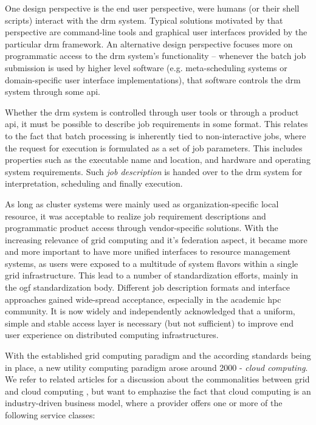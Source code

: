 \documentclass[twocolumn]{svjour3}       %
\begin{document}
One design perspective is the end user perspective, were humans (or their shell scripts) interact with the \gls{drm} system. Typical solutions motivated by that perspective are command-line tools and graphical user interfaces provided by the particular \gls{drm} framework. An alternative design perspective focuses more on programmatic access to the \gls{drm} system's functionality -- whenever the batch job submission is used by higher level software (e.g. meta-scheduling systems or domain-specific user interface implementations), that software controls the \gls{drm} system through some \gls{api}.

Whether the \gls{drm} system is controlled through user tools or through a product \gls{api}, it must be possible to describe job requirements in some format. This relates to the fact that batch processing is inherently tied to non-interactive jobs, where the request for execution is formulated as a set of job parameters. This includes properties such as the executable name and location, and hardware and operating system requirements. Such \emph{job description} is handed over to the \gls{drm} system for interpretation, scheduling and finally execution. 

As long as cluster systems were mainly used as organization-specific local resource, it was acceptable to realize job requirement descriptions and programmatic product access through vendor-specific solutions. With the increasing relevance of grid computing and it's federation aspect, it became more and more important to have more unified interfaces to resource management systems, as users were exposed to a multitude of system flavors within a single grid infrastructure. This lead to a number of standardization efforts, mainly in the \gls{ogf} standardization body. Different job description formats and interface approaches gained wide-spread acceptance, especially in the academic \gls{hpc} community. It is now widely and independently acknowledged that a uniform, simple and stable access layer is necessary (but not sufficient) to improve end user experience on distributed computing infrastructures.

With the established grid computing paradigm and the according standards being in place, a new utility computing paradigm arose around 2000 - \emph{cloud computing}. We refer to related articles for a discussion about the commonalities between grid and cloud computing \cite{citemaster_9642}, but want to emphazise the fact that cloud computing is an industry-driven business model, where a provider offers one or more of the following service classes:
\end{document}
